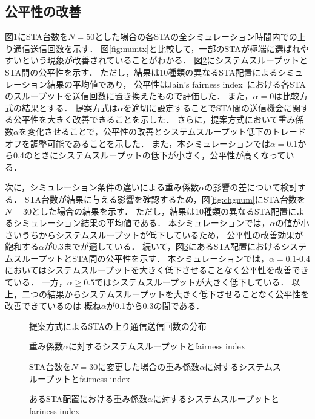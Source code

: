 \documentclass[technicalreport]{ieicej}
\begin{document}
	\subsection{公平性の改善}
	図\ref{fig:fair}にSTA台数を$N=50$とした場合の各STAの全シミュレーション時間内での上り通信送信回数を示す．
	図\ref{fig:numtx}と比較して，一部のSTAが極端に選ばれやすいという現象が改善されていることがわかる．
	図\ref{fig:thr_fair}にシステムスループットとSTA間の公平性を示す．
	ただし，結果は10種類の異なるSTA配置によるシミュレーション結果の平均値であり，
	公平性はJain's fairness index~\cite{jain}における各STAのスループットを送信回数に置き換えたもので評価した．
	また，$\alpha=0$は比較方式の結果とする．
	提案方式は$\alpha$を適切に設定することでSTA間の送信機会に関する公平性を大きく改善できることを示した．
	さらに，提案方式において重み係数$\alpha$を変化させることで，公平性の改善とシステムスループット低下のトレードオフを調整可能であることを示した．
	また，本シミュレーションでは$\alpha=$0.1から0.4のときにシステムスループットの低下が小さく，公平性が高くなっている．
	\par
	次に，シミュレーション条件の違いによる重み係数$\alpha$の影響の差について検討する．
	STA台数が結果に与える影響を確認するため，図\ref{fig:chgnum}にSTA台数を$N=30$とした場合の結果を示す．
	ただし，結果は10種類の異なるSTA配置によるシミュレーション結果の平均値である．
	本シミュレーションでは，$\alpha$の値が小さいうちからシステムスループットが低下しているため，
	公平性の改善効果が飽和する$\alpha$が0.3までが適している．
	続いて，図\ref{fig:chgtopology}にあるSTA配置におけるシステムスループットとSTA間の公平性を示す．
	本シミュレーションでは，$\alpha=$0.1-0.4においてはシステムスループットを大きく低下させることなく公平性を改善できている．
	一方，$\alpha\geq0.5$ではシステムスループットが大きく低下している．
	以上，二つの結果からシステムスループットを大きく低下させることなく公平性を改善できているのは
	概ね$\alpha$が0.1から0.3の間である．

	\begin{figure}[t]
		\centering
		\caption{提案方式によるSTAの上り通信送信回数の分布}
		\label{fig:fair}
	\end{figure}

	\begin{figure}[t]
		\centering
		\caption{重み係数$\alpha$に対するシステムスループットとfairness index}
		\label{fig:thr_fair}
	\end{figure}

	\begin{figure}[t]
		\centering
			\caption{STA台数を$N=30$に変更した場合の重み係数$\alpha$に対するシステムスループットとfairness index}
			\label{fig:chgnum}

			\caption{あるSTA配置における重み係数$\alpha$に対するシステムスループットとfariness index}
			\label{fig:chgtopology}
	\end{figure}
\end{document}
